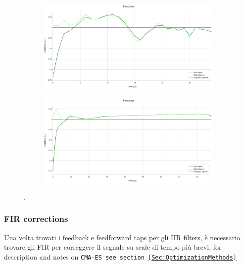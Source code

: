 \begin{figure}[h!]
    \centering
    \begin{subfigure}[t]{0.65\textwidth}
        \includegraphics[width=\textwidth]{figures/png/Cryoscope/filters/IIR_nopad.png}
        \caption{}
        \label{fig:IIR:nopad}
    \end{subfigure}
    \vspace{0.5cm}
    \begin{subfigure}[t]{0.65\textwidth}
        \includegraphics[width=\textwidth]{figures/png/Cryoscope/filters_long/IIR.png}
        \caption{}
        \label{fig:IIR:long}        
    \end{subfigure}
    \caption{.}
    \label{fig:IIR}
\end{figure}


\subsubsection{FIR corrections}
Una volta trovati i feedback e feedforward taps per gli IIR filters, è necessario trovare gli FIR per correggere il segnale su scale di tempo più brevi. 
for description and notes on \tt{CMA-ES} see section \ref{Sec:OptimizationMethods}

